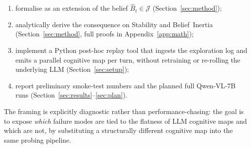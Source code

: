 \begin{enumerate}
\item formalise \tb as an extension of the \tos belief
$\hat B_t \in \mathcal{J}$ (Section~\ref{sec:method});

\item analytically derive the consequence on Stability and
Belief~Inertia (Section~\ref{sec:method}, full proofs in
Appendix~\ref{app:math});

\item implement a Python post-hoc replay tool that ingests the
\tos exploration log and emits a parallel \tb cognitive map per turn,
without retraining or re-rolling the underlying LLM
(Section~\ref{sec:setup});

\item report preliminary smoke-test numbers and the planned full
Qwen-VL-7B runs (Section~\ref{sec:results}--\ref{sec:plan}).
\end{enumerate}

The framing is explicitly diagnostic rather than performance-chasing:
the goal is to expose \emph{which} \tos failure modes are tied to the
flatness of LLM cognitive maps and which are not, by substituting a
structurally different cognitive map into the same probing pipeline.

